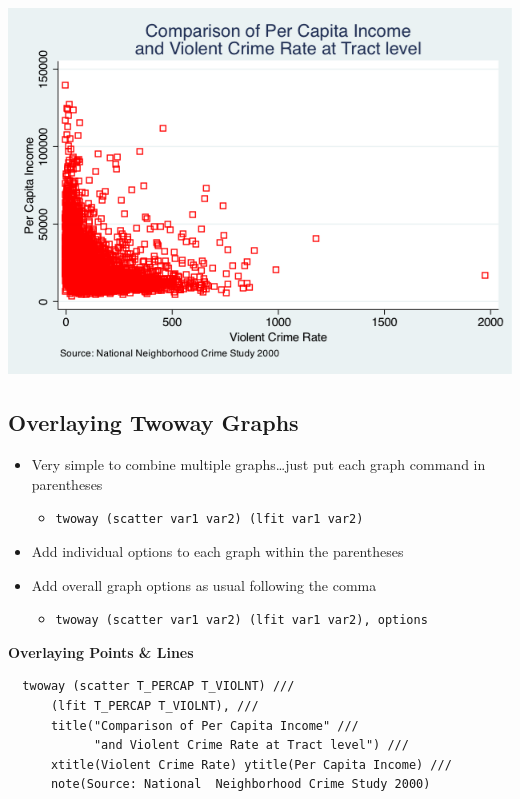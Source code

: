 \documentclass[]{book}
\providecommand{\tightlist}{%
  \setlength{\itemsep}{0pt}\setlength{\parskip}{0pt}}
\begin{document}
\includegraphics{Stata/StataModGraph/images/msymbol_mcolor.png}

\hypertarget{overlaying-twoway-graphs}{%
\subsection{Overlaying Twoway Graphs}\label{overlaying-twoway-graphs}}

\begin{itemize}
\tightlist
\item
  Very simple to combine multiple graphs\ldots{}just put each graph command in parentheses

  \begin{itemize}
  \tightlist
  \item
    \texttt{twoway\ (scatter\ var1\ var2)\ (lfit\ var1\ var2)}
  \end{itemize}
\item
  Add individual options to each graph within the parentheses
\item
  Add overall graph options as usual following the comma

  \begin{itemize}
  \tightlist
  \item
    \texttt{twoway\ (scatter\ var1\ var2)\ (lfit\ var1\ var2),\ options}
  \end{itemize}
\end{itemize}

\textbf{Overlaying Points \& Lines}

\begin{verbatim}
  twoway (scatter T_PERCAP T_VIOLNT) ///
      (lfit T_PERCAP T_VIOLNT), ///
      title("Comparison of Per Capita Income" ///
            "and Violent Crime Rate at Tract level") ///
      xtitle(Violent Crime Rate) ytitle(Per Capita Income) ///
      note(Source: National  Neighborhood Crime Study 2000)
\end{verbatim}
\end{document}
